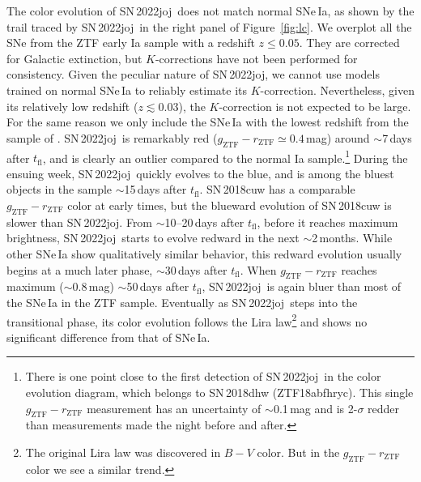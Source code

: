 \documentclass[twocolumn]{aastex631}
\newcommand{\sn}{SN\,2022joj}
\newcommand{\tfl}{$t_\mathrm{fl}$}
\begin{document}
\begin{CJK*}{UTF8}{gbsn}
The color evolution of \sn\ does not match normal SNe\,Ia, as shown by the trail traced by \sn\ in the right panel of Figure~\ref{fig:lc}. We overplot all the SNe from the ZTF early Ia sample \citep{Bulla2020} with a redshift $z\le0.05$. They are corrected for Galactic extinction, but $K$-corrections have not been performed for consistency. Given the peculiar nature of \sn, we cannot use models trained on normal SNe\,Ia to reliably estimate its $K$-correction. Nevertheless, given its relatively low redshift ($z\lesssim0.03$), the $K$-correction is not expected to be large. For the same reason we only include the SNe\,Ia with the lowest redshift from the sample of \citet{Bulla2020}. 
\sn\ is remarkably red ($g_\mathrm{ZTF} - r_\mathrm{ZTF}\simeq0.4$\,mag) around $\sim$7\,days after $t_\mathrm{fl}$, and is clearly an outlier compared to the normal Ia sample.\footnote{There is one point close to the first detection of \sn\ in the color evolution diagram, which belongs to SN\,2018dhw (ZTF18abfhryc). This single $g_\mathrm{ZTF}-r_\mathrm{ZTF}$ measurement has an uncertainty of $\sim$0.1\,mag and is 2-$\sigma$ redder than measurements made the night before and after.} 
During the ensuing week, \sn\ quickly evolves to the blue, and is among the bluest objects in the sample $\sim$15\,days after $t_\mathrm{fl}$. SN\,2018cuw has a comparable $g_\mathrm{ZTF} - r_\mathrm{ZTF}$ color at early times, but the blueward evolution of SN\,2018cuw is slower than \sn. 
From $\sim$10--20\,days after \tfl, before it reaches maximum brightness, \sn\ starts to evolve redward in the next $\sim$2\,months. While other SNe\,Ia show qualitatively similar behavior, this redward evolution usually begins at a much later phase, $\sim$30\,days after \tfl. 
When $g_\mathrm{ZTF} - r_\mathrm{ZTF}$ reaches maximum ($\sim$0.8\,mag) $\sim$50\,days after \tfl, \sn\ is again bluer than most of the SNe\,Ia in the ZTF sample. 
Eventually as \sn\ steps into the transitional phase, its color evolution follows the Lira law\footnote{The original Lira law was discovered in $B-V$ color. But in the $g_\mathrm{ZTF}-r_\mathrm{ZTF}$ color we see a similar trend.} \citep{Lira_1996,Phillips_1999} and shows no significant difference from that of SNe\,Ia.


\end{CJK*}
\end{document}

